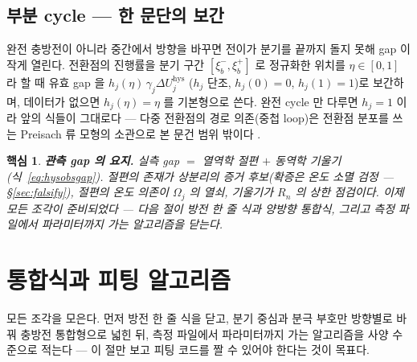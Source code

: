 \documentclass[11pt,a4paper]{article}
\newtheorem*{keybox}{핵심}
\newcommand{\hys}{\mathrm{hys}}
\begin{document}
\subsection{부분 cycle — 한 문단의 보간}
완전 충방전이 아니라 중간에서 방향을 바꾸면 전이가 분기를 끝까지 돌지 못해 gap 이 작게 열린다. 전환점의
진행률을 분기 구간 $[\xi_b^-,\xi_b^+]$ 로 정규화한 위치를 $\eta\in[0,1]$ 라 할 때 유효 gap 을 $h_j(\eta)\,\gamma_j\Delta U_j^\hys$
($h_j$ 단조, $h_j(0)=0$, $h_j(1)=1$)로 보간하며, 데이터가 없으면 $h_j(\eta)=\eta$ 를 기본형으로 쓴다. 완전 cycle 만
다루면 $h_j=1$ 이라 앞의 식들이 그대로다 — 다중 전환점의 경로 의존(중첩 loop)은 전환점 분포를 쓰는
Preisach 류 모형의 소관으로 본 문건 범위 밖이다 \cite{sethna1993}.

\begin{keybox}
\textbf{관측 gap 의 요지.} 실측 gap $=$ 열역학 절편 $+$ 동역학 기울기(식~\eqref{eq:hysobsgap}). 절편의
존재가 상분리의 증거 후보(확증은 온도 소멸 검정 — \S\ref{sec:falsify}), 절편의 온도 의존이
$\Omega_j$ 의 열쇠, 기울기가 $R_n$ 의 상한 점검이다. 이제 모든
조각이 준비되었다 — 다음 절이 방전 한 줄 식과 양방향 통합식, 그리고 측정 파일에서 파라미터까지 가는
알고리즘을 닫는다.
\end{keybox}

\section{통합식과 피팅 알고리즘}\label{sec:master}
모든 조각을 모은다. 먼저 방전 한 줄 식을 닫고, 분기 중심과 분극 부호만 방향별로 바꿔 충방전 통합형으로
넓힌 뒤, 측정 파일에서 파라미터까지 가는 알고리즘을 사양 수준으로 적는다 — 이 절만 보고 피팅 코드를 짤 수
있어야 한다는 것이 목표다.
\end{document}
